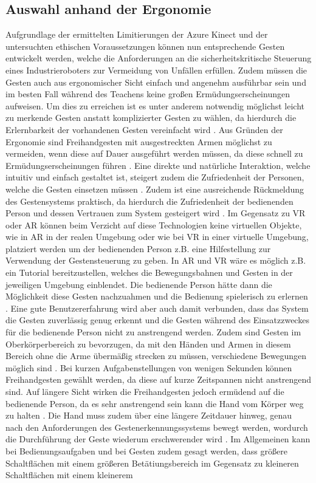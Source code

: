 \subsection{Auswahl anhand der Ergonomie}
Aufgrundlage der ermittelten Limitierungen der Azure Kinect und der untersuchten ethischen Voraussetzungen können nun entsprechende Gesten entwickelt werden, welche die Anforderungen an die sicherheitskritische Steuerung eines Industrieroboters zur Vermeidung von Unfällen erfüllen. Zudem müssen die Gesten auch aus ergonomischer Sicht einfach und angenehm ausführbar sein und im besten Fall während des Teachens keine großen Ermüdungserscheinungen aufweisen. Um dies zu erreichen ist es unter anderem notwendig möglichst leicht zu merkende Gesten anstatt komplizierter Gesten zu wählen, da hierdurch die Erlernbarkeit der vorhandenen Gesten vereinfacht wird \cite[97]{schleicher_einfuhrung_2020}. Aus Gründen der Ergonomie sind Freihandgesten mit ausgestreckten Armen möglichst zu vermeiden, wenn diese auf Dauer ausgeführt werden müssen, da diese schnell zu Ermüdungserscheinungen führen \cite[84]{neupert_naturliche_nodate}. Eine direkte und natürliche Interaktion, welche intuitiv und einfach gestaltet ist, steigert zudem die Zufriedenheit der Personen, welche die Gesten einsetzen müssen \cite[103]{schleicher_einfuhrung_2020}. Zudem ist eine ausreichende Rückmeldung des Gestensystems praktisch, da hierdurch die Zufriedenheit der bedienenden Person und dessen Vertrauen zum System gesteigert wird \cite[132\psq]{schleicher_einfuhrung_2020}. Im Gegensatz zu VR oder AR können beim Verzicht auf diese Technologien keine virtuellen Objekte, wie in AR in der realen Umgebung oder wie bei VR in einer virtuelle Umgebung, platziert werden um der bedienenden Person z.B. eine Hilfestellung zur Verwendung der Gestensteuerung zu geben. In AR und VR wäre es möglich z.B. ein Tutorial bereitzustellen, welches die Bewegungsbahnen und Gesten in der jeweiligen Umgebung einblendet. Die bedienende Person hätte dann die Möglichkeit diese Gesten nachzuahmen und die Bedienung spielerisch zu erlernen \cite{weidenhausen_mobile_2007}. Eine gute Benutzererfahrung wird aber auch damit verbunden, dass das System die Gesten zuverlässig genug erkennt und die Gesten während des Einsatzzweckes für die bedienende Person nicht zu anstrengend werden. Zudem sind Gesten im Oberkörperbereich zu bevorzugen, da mit den Händen und Armen in diesem Bereich ohne die Arme übermäßig strecken zu müssen, verschiedene Bewegungen möglich sind \cite{nowack_pdf_2017}. Bei kurzen Aufgabenstellungen von wenigen Sekunden können Freihandgesten gewählt werden, da diese auf kurze Zeitspannen nicht anstrengend sind. Auf längere Sicht wirken die Freihandgesten jedoch ermüdend auf die bedienende Person, da es sehr anstrengend sein kann die Hand vom Körper weg zu halten \cite{krammling_user_2018}. Die Hand muss zudem über eine längere Zeitdauer hinweg, genau nach den Anforderungen des Gestenerkennungssystems bewegt werden, wordurch die Durchführung der Geste wiederum erschwerender wird \cite{erickjpaul_komfort_nodate}. Im Allgemeinen kann bei Bedienungsaufgaben und bei Gesten zudem gesagt werden, dass größere Schaltflächen mit einem größeren Betätiungsbereich im Gegensatz zu kleineren Schaltflächen mit einem kleinerem 